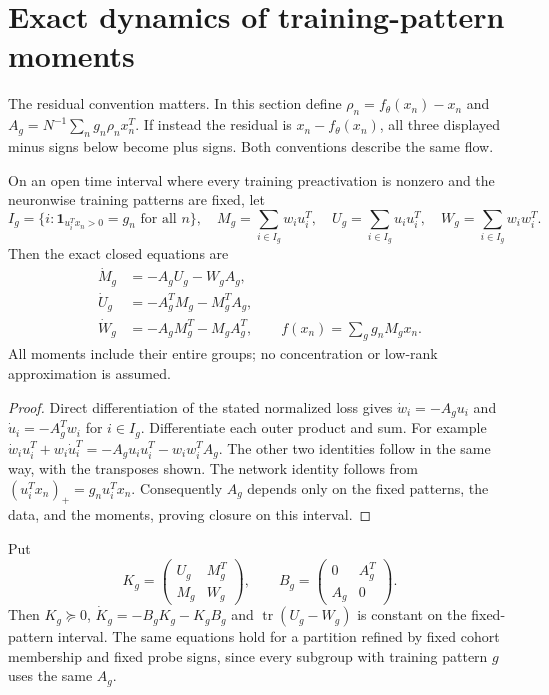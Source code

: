\section{Exact dynamics of training-pattern moments}
\label{sec:pattern-quotient}
The residual convention matters. In this section define
$\rho_n=f_\theta(x_n)-x_n$ and
$A_g=N^{-1}\sum_n g_n\rho_nx_n^T$.
If instead the residual is $x_n-f_\theta(x_n)$, all three displayed minus
signs below become plus signs. Both conventions describe the same flow.

\begin{lemma}\label{lem:pattern-quotient}
On an open time interval where every training preactivation is nonzero
and the neuronwise training patterns are fixed, let
\[
 I_g=\{i:\mathbf1_{u_i^Tx_n>0}=g_n\text{ for all }n\},\quad
 M_g=\sum_{i\in I_g}w_iu_i^T,\quad
 U_g=\sum_{i\in I_g}u_iu_i^T,\quad
 W_g=\sum_{i\in I_g}w_iw_i^T.
\]
Then the exact closed equations are
\begin{align*}
 \dot M_g&=-A_gU_g-W_gA_g,\\
 \dot U_g&=-A_g^TM_g-M_g^TA_g,\\
 \dot W_g&=-A_gM_g^T-M_gA_g^T,
 \qquad f(x_n)=\sum_g g_nM_gx_n.
\end{align*}
All moments include their entire groups; no concentration or low-rank
approximation is assumed.
\end{lemma}
\begin{proof}
Direct differentiation of the stated normalized loss gives
$\dot w_i=-A_gu_i$ and $\dot u_i=-A_g^Tw_i$ for $i\in I_g$.
Differentiate each outer product and sum. For example
$\dot w_iu_i^T+w_i\dot u_i^T=-A_gu_iu_i^T-w_iw_i^TA_g$.
The other two identities follow in the same way, with the transposes shown.
The network identity follows from $(u_i^Tx_n)_+=g_nu_i^Tx_n$.
Consequently $A_g$ depends only on the fixed patterns, the data, and the
moments, proving closure on this interval.
\end{proof}

Put
\[
 K_g=\begin{pmatrix}U_g&M_g^T\\M_g&W_g\end{pmatrix},\qquad
 B_g=\begin{pmatrix}0&A_g^T\\A_g&0\end{pmatrix}.
\]
Then $K_g\succeq0$, $\dot K_g=-B_gK_g-K_gB_g$ and
$\operatorname{tr}(U_g-W_g)$ is constant on the fixed-pattern interval.
The same equations hold for a partition refined by fixed cohort membership
and fixed probe signs, since every subgroup with training pattern $g$
uses the same $A_g$.

